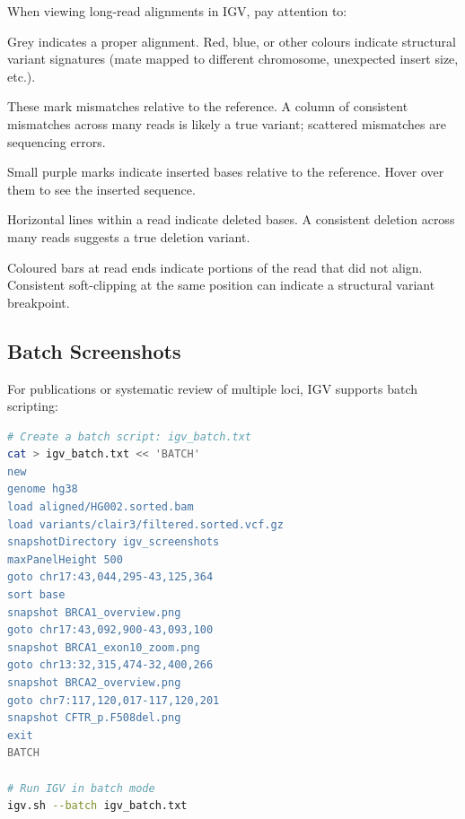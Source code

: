 When viewing long-read alignments in IGV, pay attention to:

\begin{description}[nosep]
  \item[Read colour] Grey indicates a proper alignment. Red, blue, or other colours indicate structural variant signatures (mate mapped to different chromosome, unexpected insert size, etc.).
  \item[Coloured bases within reads] These mark mismatches relative to the reference. A column of consistent mismatches across many reads is likely a true variant; scattered mismatches are sequencing errors.
  \item[Insertions (purple ``I'')] Small purple marks indicate inserted bases relative to the reference. Hover over them to see the inserted sequence.
  \item[Deletions (thin lines)] Horizontal lines within a read indicate deleted bases. A consistent deletion across many reads suggests a true deletion variant.
  \item[Soft-clipped regions] Coloured bars at read ends indicate portions of the read that did not align. Consistent soft-clipping at the same position can indicate a structural variant breakpoint.
\end{description}

\subsection{Batch Screenshots}
\label{subsec:diyanalysis:igv_batch}

For publications or systematic review of multiple loci, IGV supports batch scripting:

\begin{lstlisting}[language=bash,caption={IGV batch script for automated screenshots.},label=lst:diy-igv-batch]
# Create a batch script: igv_batch.txt
cat > igv_batch.txt << 'BATCH'
new
genome hg38
load aligned/HG002.sorted.bam
load variants/clair3/filtered.sorted.vcf.gz
snapshotDirectory igv_screenshots
maxPanelHeight 500
goto chr17:43,044,295-43,125,364
sort base
snapshot BRCA1_overview.png
goto chr17:43,092,900-43,093,100
snapshot BRCA1_exon10_zoom.png
goto chr13:32,315,474-32,400,266
snapshot BRCA2_overview.png
goto chr7:117,120,017-117,120,201
snapshot CFTR_p.F508del.png
exit
BATCH

# Run IGV in batch mode
igv.sh --batch igv_batch.txt
\end{lstlisting}

